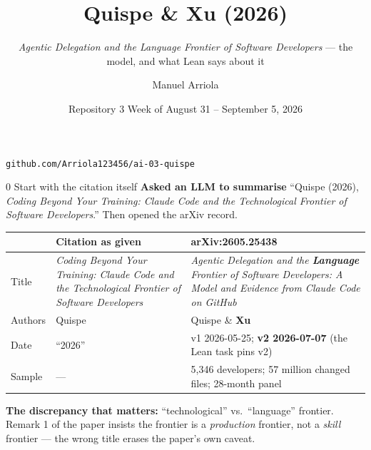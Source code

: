 \documentclass[aspectratio=169,11pt]{beamer}
\title{Quispe \& Xu (2026)}
\subtitle{\emph{Agentic Delegation and the Language Frontier of Software Developers} --- the model, and what Lean says about it}
\author{Manuel Arriola}
\date{Repository 3 \textperiodcentered{} Week of August 31 -- September 5, 2026}
\begin{document}
\begin{frame}[plain]
  \titlepage
  \begin{center}\small
    \texttt{github.com/Arriola123456/ai-03-quispe}
  \end{center}
\end{frame}

\begin{frame}{0 \textperiodcentered{} Start with the citation itself}
  \textbf{Asked an LLM to summarise} ``Quispe (2026), \emph{Coding Beyond Your Training:
  Claude Code and the Technological Frontier of Software Developers}.''
  Then opened the arXiv record.

  \medskip
  \footnotesize
  \begin{tabular}{@{}p{1.5cm}p{5.3cm}p{6.2cm}@{}}
    \toprule
     & Citation as given & arXiv:2605.25438 \\
    \midrule
    Title & \emph{Coding Beyond Your Training: Claude Code and the Technological Frontier of Software Developers} &
      \emph{Agentic Delegation and the \textbf{Language} Frontier of Software Developers: A Model and Evidence from Claude Code on GitHub} \\
    Authors & Quispe & Quispe \& \textbf{Xu} \\
    Date & ``2026'' & v1 2026-05-25; \textbf{v2 2026-07-07} (the Lean task pins v2) \\
    Sample & --- & 5{,}346 developers; 57 million changed files; 28-month panel \\
    \bottomrule
  \end{tabular}
  \normalsize

  \medskip
  \textbf{The discrepancy that matters:} ``technological'' vs.\ ``language'' frontier.
  Remark 1 of the paper insists the frontier is a \emph{production} frontier, not a
  \emph{skill} frontier --- the wrong title erases the paper's own caveat.
\end{frame}
\end{document}
